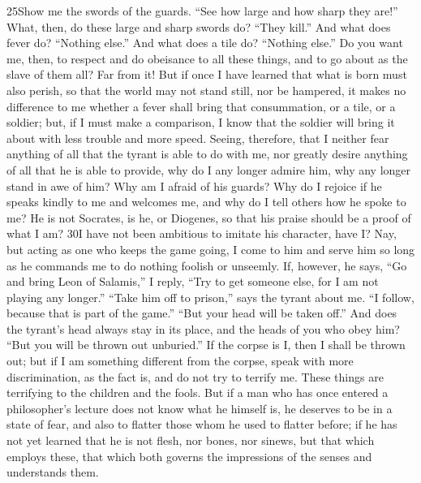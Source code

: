 25Show me the swords of the guards. ``See how large and how sharp they are!'' What, then, do these large and sharp swords do? ``They kill.'' And what does fever do? ``Nothing else.'' And what does a tile do? ``Nothing else.'' Do you want me, then, to respect and do obeisance to all these things, and to go about as the slave of them all? Far from it! But if once I have learned that what is born must also perish, so that the world may not stand still, nor be hampered, it makes no difference to me whether a fever shall bring that consummation, or a tile, or a soldier; but, if I must make a comparison, I know that the soldier will bring it about with less trouble and more speed. Seeing, therefore, that I neither fear anything of all that the tyrant is able to do with me, nor greatly desire anything of all that he is able to provide, why do I any longer admire him, why any longer stand in awe of him? Why am I afraid of his guards? Why do I rejoice if he speaks kindly to me and welcomes me, and why do I tell others how he spoke to me? He is not Socrates, is he, or Diogenes, so that his praise should be a proof of what I am? 30I have not been ambitious to imitate his character, have I? Nay, but acting as one who keeps the game going, I come to him and serve him so long as he commands me to do nothing foolish or unseemly. If, however, he says, ``Go and bring Leon of Salamis,'' I reply, ``Try to get someone else, for I am not playing any longer.'' ``Take him off to prison,'' says the tyrant about me. ``I follow, because that is part of the game.'' ``But your head will be taken off.'' And does the tyrant's head always stay in its place, and the heads of you who obey him? ``But you will be thrown out unburied.'' If the corpse is I, then I shall be thrown out; but if I am something different from the corpse, speak with more discrimination, as the fact is, and do not try to terrify me. These things are terrifying to the children and the fools. But if a man who has once entered a philosopher's lecture does not know what he himself is, he deserves to be in a state of fear, and also to flatter those whom he used to flatter before; if he has not yet learned that he is not flesh, nor bones, nor sinews, but that which employs these, that which both governs the impressions of the senses and understands them.

